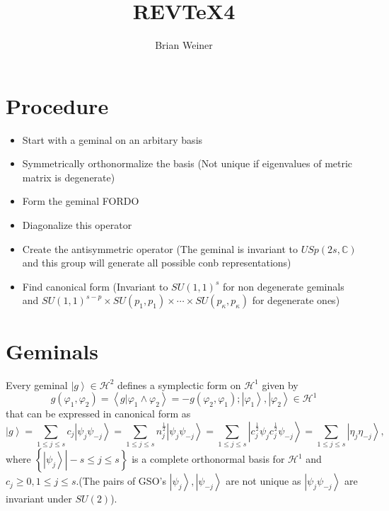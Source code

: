 \documentclass[aps,preprint]{revtex4}%
\begin{document}
\preprint{ }
\title[ ]{REV\TeX4}
\author{Brian Weiner}
\affiliation{}
\author{}
\author{}
\endpage{ }
\maketitle
\tableofcontents


\section{Procedure}

\begin{itemize}
\item Start with a geminal on an arbitary basis

\item Symmetrically orthonormalize the basis (Not unique if eigenvalues of
metric matrix is degenerate)

\item Form the geminal FORDO

\item Diagonalize this operator

\item Create the antisymmetric operator (The geminal is invariant to
$USp\left(  2s,\mathbb{C}\right)  $ and this group will generate all possible
conb representations)

\item Find canonical form (Invariant to $SU(1,1)^{s}$ for non degenerate
geminals and $SU(1,1)^{s-p}\times SU(p_{1},p_{1})\times\cdots\times
SU(p_{\kappa},p_{\kappa})$ for degenerate ones)
\end{itemize}

\section{Geminals}

Every geminal $\left\vert g\right\rangle \in\mathcal{H}^{2}$ defines a
symplectic form on $\mathcal{H}^{1}$ given by
\begin{equation}
g\left(  \varphi_{1},\varphi_{2}\right)  =\left\langle \left.  g\right\vert
\varphi_{1}\wedge\varphi_{2}\right\rangle =-g\left(  \varphi_{2},\varphi
_{1}\right)  ;\left\vert \varphi_{1}\right\rangle ,\left\vert \varphi
_{2}\right\rangle \in\mathcal{H}^{1}%
\end{equation}
that can be expressed in canonical form as
\begin{equation}
\left\vert g\right\rangle =\sum_{1\leq j\leq s}c_{j}\left\vert \psi_{j}%
\psi_{-j}\right\rangle =\sum_{1\leq j\leq s}n_{j}^{\frac{1}{2}}\left\vert
\psi_{j}\psi_{-j}\right\rangle =\sum_{1\leq j\leq s}\left\vert c_{j}^{\frac
{1}{2}}\psi_{j}c_{j}^{\frac{1}{2}}\psi_{-j}\right\rangle =\sum_{1\leq j\leq
s}\left\vert \eta_{j}\eta_{-j}\right\rangle ,
\end{equation}
where $\left\{  \left.  \left\vert \psi_{j}\right\rangle \right\vert -s\leq
j\leq s\right\}  $ is a complete orthonormal basis for $\mathcal{H}^{1}$ and
$c_{j}\geq0,1\leq j\leq s.$(The pairs of GSO's $\left\vert \psi_{j}%
\right\rangle ,\left\vert \psi_{-j}\right\rangle $ are not unique as
$\left\vert \psi_{j}\psi_{-j}\right\rangle $ are invariant under $SU(2)$).
\end{document}
